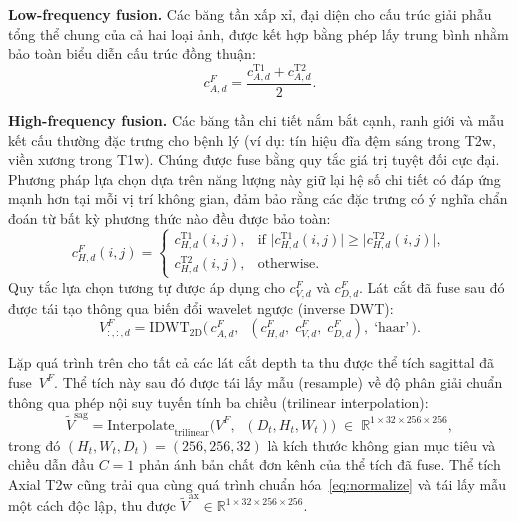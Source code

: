 \textbf{Low-frequency fusion.} Các băng tần xấp xỉ, đại diện cho cấu trúc giải phẫu tổng thể chung của cả hai loại ảnh, được kết hợp bằng phép lấy trung bình nhằm bảo toàn biểu diễn cấu trúc đồng thuận:
\begin{equation}
c_{A,d}^{F} = \frac{c_{A,d}^{\text{T1}} + c_{A,d}^{\text{T2}}}{2}.
\label{eq:lowfreq}
\end{equation}

\textbf{High-frequency fusion.} Các băng tần chi tiết nắm bắt cạnh, ranh giới và mẫu kết cấu thường đặc trưng cho bệnh lý (ví dụ: tín hiệu đĩa đệm sáng trong T2w, viền xương trong T1w). Chúng được fuse bằng quy tắc giá trị tuyệt đối cực đại. Phương pháp lựa chọn dựa trên năng lượng này giữ lại hệ số chi tiết có đáp ứng mạnh hơn tại mỗi vị trí không gian, đảm bảo rằng các đặc trưng có ý nghĩa chẩn đoán từ bất kỳ phương thức nào đều được bảo toàn:
\begin{equation}
c_{H,d}^{F}(i,j) = 
\begin{cases}
c_{H,d}^{\text{T1}}(i,j), & \text{if } \lvert c_{H,d}^{\text{T1}}(i,j) \rvert \geq \lvert c_{H,d}^{\text{T2}}(i,j) \rvert, \\[2pt]
c_{H,d}^{\text{T2}}(i,j), & \text{otherwise}.
\end{cases}
\label{eq:highfreq}
\end{equation}
Quy tắc lựa chọn tương tự được áp dụng cho $c_{V,d}^{F}$ và $c_{D,d}^{F}$. Lát cắt đã fuse sau đó được tái tạo thông qua biến đổi wavelet ngược (inverse DWT):
\begin{equation}
V_{:,:,d}^{F} = \text{IDWT}_{2\text{D}}\!\big(\, c_{A,d}^{F},\;\; (c_{H,d}^{F},\; c_{V,d}^{F},\; c_{D,d}^{F}),\; \text{`haar'}\,\big).
\label{eq:idwt}
\end{equation}

Lặp quá trình trên cho tất cả các lát cắt depth ta thu được thể tích sagittal đã fuse~$V^{F}$. Thể tích này sau đó được tái lấy mẫu (resample) về độ phân giải chuẩn thông qua phép nội suy tuyến tính ba chiều (trilinear interpolation):
\begin{equation}
\tilde{V}^{\text{sag}} = \text{Interpolate}_{\text{trilinear}}\!\big(V^{F},\;\; (D_t, H_t, W_t)\big) \;\in\; \mathbb{R}^{1 \times 32 \times 256 \times 256},
\label{eq:resize}
\end{equation}
trong đó $(H_t, W_t, D_t) = (256, 256, 32)$ là kích thước không gian mục tiêu và chiều dẫn đầu $C\!=\!1$ phản ánh bản chất đơn kênh của thể tích đã fuse. Thể tích Axial T2w cũng trải qua cùng quá trình chuẩn hóa~\eqref{eq:normalize} và tái lấy mẫu một cách độc lập, thu được $\tilde{V}^{\text{ax}} \in \mathbb{R}^{1 \times 32 \times 256 \times 256}$.

